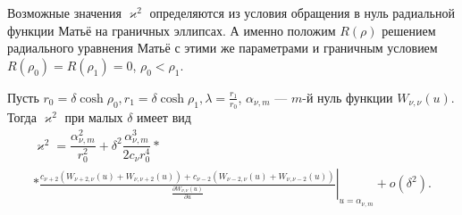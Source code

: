 Возможные значения $\varkappa^2$ определяются из условия обращения в нуль радиальной функции Матьё на граничных эллипсах. А именно положим 
$R(\rho)$ решением радиального уравнения Матьё с этими же параметрами и граничным условием $R(\rho_0)=R(\rho_1)=0$, $\rho_0 < \rho_1$. 
\begin{lemma}
Пусть $r_0 = \delta\cosh{\rho_0}, r_1 = \delta\cosh{\rho_1}, \lambda = \frac{r_1}{r_0}$, $\alpha_{\nu, m}$ --- $m$-й нуль функции $W_{\nu, \nu}(u)$. Тогда $\varkappa^2$ при малых $\delta$ имеет вид
\begin{multline*}
\varkappa^2 = \dfrac{\alpha_{\nu, m}^2}{r_0^2} + \delta^2 \dfrac{\alpha_{\nu, m}^3}{2 c_\nu r_0^4} * \\ *\left. \frac{
c_{\nu+2} \left( W_{\nu+2, \nu}(u) + W_{\nu, \nu+2}(u) \right) + 
c_{\nu-2} \left( W_{\nu-2, \nu}(u) + W_{\nu, \nu-2}(u) \right)
}{ \frac{\partial W_{\nu,\nu}(u)}{\partial u} }\right|_{u=\alpha_{\nu, m}} + o(\delta^2).
\end{multline*}
\label{th:ringLemma1}
\end{lemma}

